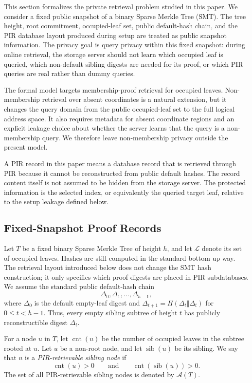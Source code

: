 This section formalizes the private retrieval problem studied in this paper. We consider a fixed public snapshot of a binary Sparse Merkle Tree (SMT). The tree height, root commitment, occupied-leaf set, public default-hash chain, and the PIR database layout produced during setup are treated as public snapshot information. The privacy goal is query privacy within this fixed snapshot: during online retrieval, the storage server should not learn which occupied leaf is queried, which non-default sibling digests are needed for its proof, or which PIR queries are real rather than dummy queries.

The formal model targets membership-proof retrieval for occupied leaves. Non-membership retrieval over absent coordinates is a natural extension, but it changes the query domain from the public occupied-leaf set to the full logical address space. It also requires metadata for absent coordinate regions and an explicit leakage choice about whether the server learns that the query is a non-membership query. We therefore leave non-membership privacy outside the present model.

A PIR record in this paper means a database record that is retrieved through PIR because it cannot be reconstructed from public default hashes. The record content itself is not assumed to be hidden from the storage server. The protected information is the selected index, or equivalently the queried target leaf, relative to the setup leakage defined below.

\subsection{Fixed-Snapshot Proof Records}

Let $T$ be a fixed binary Sparse Merkle Tree of height $h$, and let $\mathcal{L}$ denote its set of occupied leaves. Hashes are still computed in the standard bottom-up way. The retrieval layout introduced below does not change the SMT hash construction; it only specifies which proof digests are placed in PIR subdatabases. We assume the standard public default-hash chain
\[
\Delta_0,\Delta_1,\ldots,\Delta_{h-1},
\]
where $\Delta_0$ is the default empty-leaf digest and $\Delta_{t+1}=H(\Delta_t\Vert \Delta_t)$ for $0\le t<h-1$. Thus, every empty sibling subtree of height $t$ has publicly reconstructible digest $\Delta_t$.

\begin{definition}
For a node $u$ in $T$, let $\operatorname{cnt}(u)$ be the number of occupied leaves in the subtree rooted at $u$. Let $u$ be a non-root node, and let $\operatorname{sib}(u)$ be its sibling. We say that $u$ is a \emph{PIR-retrievable sibling node} if
\[
\operatorname{cnt}(u)>0
\qquad\text{and}\qquad
\operatorname{cnt}(\operatorname{sib}(u))>0.
\]
The set of all PIR-retrievable sibling nodes is denoted by $\mathcal{A}(T)$.
\end{definition}

